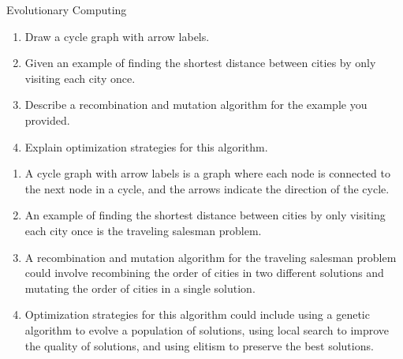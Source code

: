 \documentclass{article}
\begin{document}
\begin{exercise}{Evolutionary Computing}
  \begin{enumerate}
    \item Draw a cycle graph with arrow labels.
    \item Given an example of finding the shortest distance between cities by only visiting each city once.
    \item Describe a recombination and mutation algorithm for the example you provided.
    \item Explain optimization strategies for this algorithm.
  \end{enumerate}

  \begin{solution}
    \begin{enumerate}
      \item A cycle graph with arrow labels is a graph where each node is connected to the next node in a cycle, and the arrows indicate the direction of the cycle.
      \item An example of finding the shortest distance between cities by only visiting each city once is the traveling salesman problem.
      \item A recombination and mutation algorithm for the traveling salesman problem could involve recombining the order of cities in two different solutions and mutating the order of cities in a single solution.
      \item Optimization strategies for this algorithm could include using a genetic algorithm to evolve a population of solutions, using local search to improve the quality of solutions, and using elitism to preserve the best solutions.
    \end{enumerate}
  \end{solution}
\end{exercise}



\end{document}
